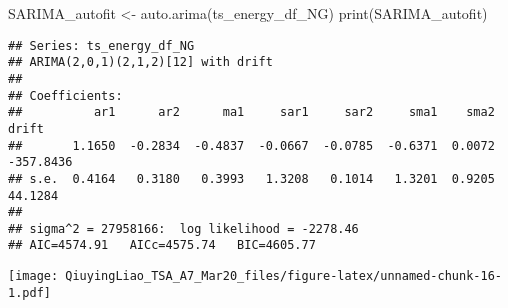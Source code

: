 \documentclass[
]{article}
\newenvironment{Shaded}{\begin{snugshade}}{\end{snugshade}}
\newcommand{\AttributeTok}[1]{\textcolor[rgb]{0.77,0.63,0.00}{#1}}
\newcommand{\DecValTok}[1]{\textcolor[rgb]{0.00,0.00,0.81}{#1}}
\newcommand{\FunctionTok}[1]{\textcolor[rgb]{0.00,0.00,0.00}{#1}}
\newcommand{\NormalTok}[1]{#1}
\newcommand{\OtherTok}[1]{\textcolor[rgb]{0.56,0.35,0.01}{#1}}
\newcommand{\SpecialCharTok}[1]{\textcolor[rgb]{0.00,0.00,0.00}{#1}}
\begin{document}
\begin{Shaded}
\begin{Highlighting}[]
\NormalTok{SARIMA\_autofit }\OtherTok{\textless{}{-}} \FunctionTok{auto.arima}\NormalTok{(ts\_energy\_df\_NG)}
\FunctionTok{print}\NormalTok{(SARIMA\_autofit)}
\end{Highlighting}
\end{Shaded}

\begin{verbatim}
## Series: ts_energy_df_NG 
## ARIMA(2,0,1)(2,1,2)[12] with drift 
## 
## Coefficients:
##          ar1      ar2      ma1     sar1     sar2     sma1    sma2      drift
##       1.1650  -0.2834  -0.4837  -0.0667  -0.0785  -0.6371  0.0072  -357.8436
## s.e.  0.4164   0.3180   0.3993   1.3208   0.1014   1.3201  0.9205    44.1284
## 
## sigma^2 = 27958166:  log likelihood = -2278.46
## AIC=4574.91   AICc=4575.74   BIC=4605.77
\end{verbatim}

\begin{Shaded}
\end{Shaded}

\texttt{[image: QiuyingLiao\_TSA\_A7\_Mar20\_files/figure-latex/unnamed-chunk-16-1.pdf]}
\end{document}
